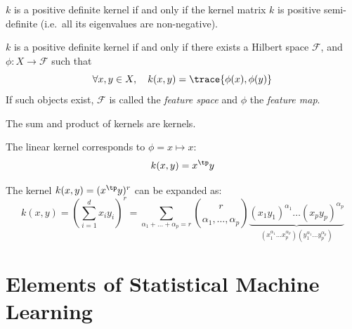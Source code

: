 \documentclass{../cs-classes/cs-classes}
\begin{document}
\begin{property}
    $k$ is a positive definite kernel if and only if the kernel matrix $k$ is positive semi-definite (i.e.~all its eigenvalues are non-negative).
\end{property}

\begin{theorem}[Aronsazjn]
    $k$ is a positive definite kernel if and only if there exists a Hilbert space $\mathcal{F}$, and $\phi:X\to\mathcal{F}$ such that
    \begin{equation*}
        \forall x, y\in X, \quad k(x, y) = \trace{\phi(x), \phi(y)}
    \end{equation*}
    If such objects exist, $\mathcal{F}$ is called the \emph{feature space} and $\phi$ the \emph{feature map}.
\end{theorem}

\begin{property}
    The sum and product of kernels are kernels.
\end{property}

\begin{example}
    The linear kernel corresponds to $\phi = x \mapsto x$:
    \begin{equation*}
        k(x, y) = x^\tp y
    \end{equation*}
\end{example}

\begin{example}
    The kernel $k(x, y) = (x^\tp y)^r$ can be expanded as:
    \begin{equation*}
        k(x, y) = \left(\sum_{i=1}^d x_iy_i\right)^r = \sum_{\alpha_1 + \dots + \alpha_p=r} \binom{r}{\alpha_1, \dots, \alpha_p} \underbrace{(x_1y_1)^{\alpha_1} \dots (x_py_p)^{\alpha_p}}_{(x_1^{\alpha_1}\dots x_p^{\alpha_p})(y_1^{\alpha_1}\dots y_p^{\alpha_p})}
    \end{equation*}
\end{example}

\begin{example}
\end{example}

\begin{example}
\end{example}

\section{Elements of Statistical Machine Learning}
\end{document}
